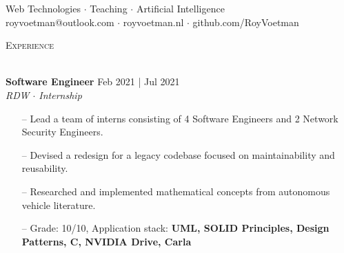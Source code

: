 \documentclass[a4paper]{article}
\newcommand{\lineunder} {
    \vspace*{-8pt} \\
    \hspace*{-18pt} \hrulefill \\
}
\newcommand{\header} [1] {
    {\hspace*{-18pt}\vspace*{6pt} \textsc{#1}}
    \vspace*{-6pt} \lineunder
}
\newcommand{\roundpic}[4][]{
  \tikz\node [circle, minimum width = #2,
    path picture = {
      \node [#1] at (path picture bounding box.center) {
        \texttt{[image: \#4]}};
    }] {};}
\begin{document}
\vspace*{-40pt}

    

\vspace*{-10pt}

\vspace{10mm}

\begin{center}
    \centering
    \raisebox{-0.5\height}{\roundpic{2cm}{2cm}{avatar.jpg}}
    \hspace*{.1in}
    
    \vspace*{10pt}
    {Web Technologies $\cdot$ Teaching $\cdot$ Artificial Intelligence}\\
    \vspace*{3pt}
	royvoetman@outlook.com $\cdot$ royvoetman.nl $\cdot$ github.com/RoyVoetman\\
\end{center}

\vspace{5mm}

\header{Experience}
\vspace{1mm}

\textbf{Software Engineer} \hfill \color{gray} Feb 2021 | Jul 2021 \color{black}\\
\textit{RDW $\cdot$ Internship}\\
\vspace{-1mm}
\begin{itemize} \itemsep 1pt
    \item[--] Lead a team of interns consisting of 4 Software Engineers and 2 Network Security Engineers.
    \item[--] Devised a redesign for a legacy codebase focused on maintainability and reusability.
    \item[--] Researched and implemented mathematical concepts from autonomous vehicle literature.
	\item[--] Grade: 10/10, Application stack: \textbf{UML, SOLID Principles, Design Patterns, C\scalebox{0.7}{++}, NVIDIA Drive, Carla}
\end{itemize}
\end{document}
